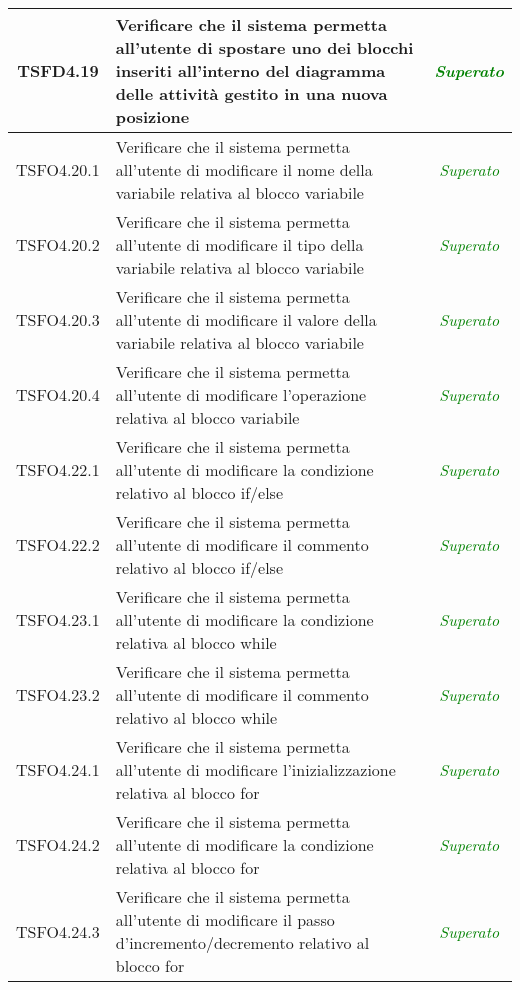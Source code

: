 \begin{longtable}{|c|>{}m{8cm}|c|}
\hypertarget{TSFD4.19}{TSFD4.19} & Verificare che il sistema permetta all'utente di spostare uno dei blocchi inseriti all'interno del diagramma delle attività gestito in una nuova posizione & \textcolor{Green}{\textit{Superato}}\\ \hline
\hypertarget{TSFO4.20.1}{TSFO4.20.1} & Verificare che il sistema permetta all'utente di modificare il nome della variabile relativa al blocco variabile & \textcolor{Green}{\textit{Superato}}\\ \hline
\hypertarget{TSFO4.20.2}{TSFO4.20.2} & Verificare che il sistema permetta all'utente di modificare il tipo della variabile relativa al blocco variabile & \textcolor{Green}{\textit{Superato}}\\ \hline
\hypertarget{TSFO4.20.3}{TSFO4.20.3} & Verificare che il sistema permetta all'utente di modificare il valore della variabile relativa al blocco variabile & \textcolor{Green}{\textit{Superato}}\\ \hline
\hypertarget{TSFO4.20.4}{TSFO4.20.4} & Verificare che il sistema permetta all'utente di modificare l'operazione relativa al blocco variabile & \textcolor{Green}{\textit{Superato}}\\ \hline
\hypertarget{TSFO4.22.1}{TSFO4.22.1} & Verificare che il sistema permetta all'utente di modificare la condizione relativo al blocco if/else & \textcolor{Green}{\textit{Superato}}\\ \hline
\hypertarget{TSFO4.22.2}{TSFO4.22.2} & Verificare che il sistema permetta all'utente di modificare il commento relativo al blocco if/else & \textcolor{Green}{\textit{Superato}}\\ \hline
\hypertarget{TSFO4.23.1}{TSFO4.23.1} & Verificare che il sistema permetta all'utente di modificare la condizione relativa al blocco while & \textcolor{Green}{\textit{Superato}}\\ \hline
\hypertarget{TSFO4.23.2}{TSFO4.23.2} & Verificare che il sistema permetta all'utente di modificare il commento relativo al blocco while & \textcolor{Green}{\textit{Superato}}\\ \hline
\hypertarget{TSFO4.24.1}{TSFO4.24.1} & Verificare che il sistema permetta all'utente di modificare l'inizializzazione relativa al blocco for & \textcolor{Green}{\textit{Superato}}\\ \hline
\hypertarget{TSFO4.24.2}{TSFO4.24.2} & Verificare che il sistema permetta all'utente di modificare la condizione relativa al blocco for & \textcolor{Green}{\textit{Superato}}\\ \hline
\hypertarget{TSFO4.24.3}{TSFO4.24.3} & Verificare che il sistema permetta all'utente di modificare il passo d'incremento/decremento relativo al blocco for & \textcolor{Green}{\textit{Superato}}\\ \hline

\end{longtable}
